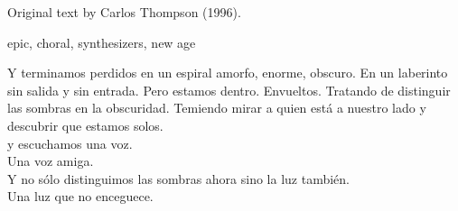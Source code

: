 

\begin{notes}
Original text by Carlos Thompson (1996).
\end{notes}

\begin{style}
epic, choral, synthesizers, new age
\end{style}

\begin{lyrics}
Y terminamos perdidos en un espiral amorfo, enorme, obscuro. %
En un laberinto sin salida y sin entrada. %
Pero estamos dentro. Envueltos. %
Tratando de distinguir las sombras en la obscuridad. %
Temiendo mirar a quien está a nuestro lado y descubrir que estamos solos.\\
y escuchamos una voz.\\
Una voz amiga.\\
Y no sólo distinguimos las sombras ahora sino la luz también.\\
Una luz que no enceguece.

\end{lyrics}

